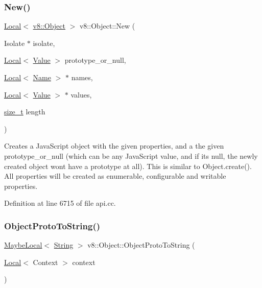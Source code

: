 \subsubsection{\texorpdfstring{New()}{New()}}
{\footnotesize\ttfamily \mbox{\hyperlink{classv8_1_1Local}{Local}}$<$ \mbox{\hyperlink{classv8_1_1Object}{v8\+::\+Object}} $>$ v8\+::\+Object\+::\+New (\begin{DoxyParamCaption}\item[{Isolate $\ast$}]{isolate,  }\item[{\mbox{\hyperlink{classv8_1_1Local}{Local}}$<$ \mbox{\hyperlink{classv8_1_1Value}{Value}} $>$}]{prototype\+\_\+or\+\_\+null,  }\item[{\mbox{\hyperlink{classv8_1_1Local}{Local}}$<$ \mbox{\hyperlink{classv8_1_1Name}{Name}} $>$ $\ast$}]{names,  }\item[{\mbox{\hyperlink{classv8_1_1Local}{Local}}$<$ \mbox{\hyperlink{classv8_1_1Value}{Value}} $>$ $\ast$}]{values,  }\item[{\mbox{\hyperlink{classsize__t}{size\+\_\+t}}}]{length }\end{DoxyParamCaption})\hspace{0.3cm}{\ttfamily [static]}}

Creates a Java\+Script object with the given properties, and a the given prototype\+\_\+or\+\_\+null (which can be any Java\+Script value, and if it\textquotesingle{}s null, the newly created object won\textquotesingle{}t have a prototype at all). This is similar to Object.\+create(). All properties will be created as enumerable, configurable and writable properties. 

Definition at line 6715 of file api.\+cc.

\mbox{\label{classv8_1_1Object_a8e9c3e8be24b1d4ae1f943af261d45ae}} 
\subsubsection{\texorpdfstring{Object\+Proto\+To\+String()}{ObjectProtoToString()}}
{\footnotesize\ttfamily \mbox{\hyperlink{classv8_1_1MaybeLocal}{Maybe\+Local}}$<$ \mbox{\hyperlink{classv8_1_1String}{String}} $>$ v8\+::\+Object\+::\+Object\+Proto\+To\+String (\begin{DoxyParamCaption}\item[{\mbox{\hyperlink{classv8_1_1Local}{Local}}$<$ Context $>$}]{context }\end{DoxyParamCaption})}

